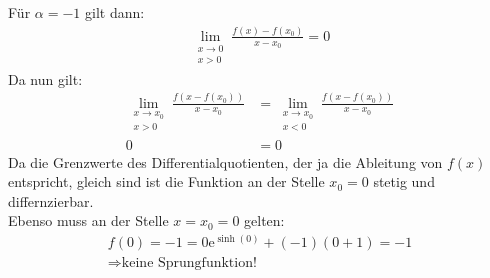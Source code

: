 Für $ \alpha=-1 $ gilt dann:\\
\begin{align*}
\lim\limits_ {\substack{x\to 0\\x>0}}\frac{f(x)-f(x_0)}{x-x_0}=0
\end{align*}
Da nun gilt:\\
\begin{align*}
\lim\limits_ {\substack{x\to x_0\\x>0}}\frac{f(x-f(x_0))}{x-x_0}&=\lim\limits_ {\substack{x\to x_0\\x<0}}\frac{f(x-f(x_0))}{x-x_0}\\
0&=0
\end{align*}
Da die Grenzwerte des Differentialquotienten, der ja die Ableitung von $ f(x) $ entspricht, gleich sind ist die Funktion an der Stelle $ x_0=0 $ stetig und differnzierbar.\\
Ebenso muss an der Stelle $ x=x_0=0 $ gelten:\\
\begin{align*}
f(0)=-1=0\mathrm{e}^{\sinh(0)}+(-1)(0+1)=-1\\
\Rightarrow\text{keine Sprungfunktion! }
\end{align*}
\newpage
\noindent
